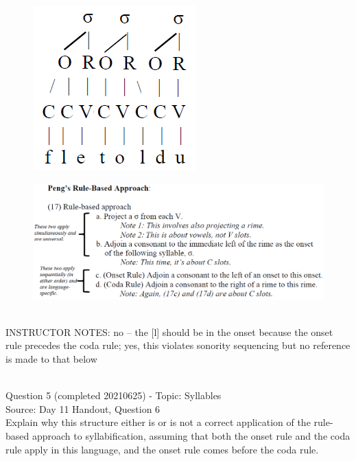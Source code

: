 \documentclass[12pt]{article}
\begin{document}
\begin{figure}[H]
\includegraphics{../images/pengrules_fletoldu_no.png}
\end{figure}
\begin{figure}[H]
\includegraphics{../images/peng_rules.png}
\end{figure}

~\\
INSTRUCTOR NOTES: no -- the [l] should be in the onset because the onset rule precedes the coda rule; yes, this violates sonority sequencing but no reference is made to that below


~\\

{\large Question 5} (completed 20210625) - Topic: Syllables\\
Source: Day 11 Handout, Question 6\\

Explain why this structure either is or is not a correct application of the rule-based approach to syllabification, assuming that both the onset rule and the coda rule apply in this language, and the onset rule comes before the coda rule.\\
\end{document}
